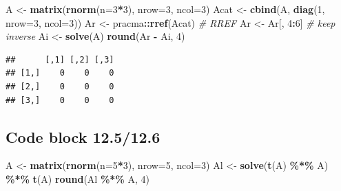 \documentclass[
]{book}
\newenvironment{Shaded}{\begin{snugshade}}{\end{snugshade}}
\newcommand{\CommentTok}[1]{\textcolor[rgb]{0.56,0.35,0.01}{\textit{#1}}}
\newcommand{\DataTypeTok}[1]{\textcolor[rgb]{0.13,0.29,0.53}{#1}}
\newcommand{\DecValTok}[1]{\textcolor[rgb]{0.00,0.00,0.81}{#1}}
\newcommand{\KeywordTok}[1]{\textcolor[rgb]{0.13,0.29,0.53}{\textbf{#1}}}
\newcommand{\NormalTok}[1]{#1}
\newcommand{\OperatorTok}[1]{\textcolor[rgb]{0.81,0.36,0.00}{\textbf{#1}}}
\newcommand{\StringTok}[1]{\textcolor[rgb]{0.31,0.60,0.02}{#1}}
\begin{document}
\begin{Shaded}
\begin{Highlighting}[]
\NormalTok{A \textless{}{-}}\StringTok{ }\KeywordTok{matrix}\NormalTok{(}\KeywordTok{rnorm}\NormalTok{(}\DataTypeTok{n=}\DecValTok{3}\OperatorTok{*}\DecValTok{3}\NormalTok{), }\DataTypeTok{nrow=}\DecValTok{3}\NormalTok{, }\DataTypeTok{ncol=}\DecValTok{3}\NormalTok{)}
\NormalTok{Acat \textless{}{-}}\StringTok{ }\KeywordTok{cbind}\NormalTok{(A, }\KeywordTok{diag}\NormalTok{(}\DecValTok{1}\NormalTok{, }\DataTypeTok{nrow=}\DecValTok{3}\NormalTok{, }\DataTypeTok{ncol=}\DecValTok{3}\NormalTok{))}
\NormalTok{Ar \textless{}{-}}\StringTok{ }\NormalTok{pracma}\OperatorTok{::}\KeywordTok{rref}\NormalTok{(Acat) }\CommentTok{\# RREF}
\NormalTok{Ar \textless{}{-}}\StringTok{ }\NormalTok{Ar[, }\DecValTok{4}\OperatorTok{:}\DecValTok{6}\NormalTok{] }\CommentTok{\# keep inverse}
\NormalTok{Ai \textless{}{-}}\StringTok{ }\KeywordTok{solve}\NormalTok{(A)}
\KeywordTok{round}\NormalTok{(Ar }\OperatorTok{{-}}\StringTok{ }\NormalTok{Ai, }\DecValTok{4}\NormalTok{)}
\end{Highlighting}
\end{Shaded}

\begin{verbatim}
##      [,1] [,2] [,3]
## [1,]    0    0    0
## [2,]    0    0    0
## [3,]    0    0    0
\end{verbatim}

\hypertarget{code-block-12.512.6}{%
\subsection*{Code block 12.5/12.6}\label{code-block-12.512.6}}

\begin{Shaded}
\begin{Highlighting}[]
\NormalTok{A \textless{}{-}}\StringTok{ }\KeywordTok{matrix}\NormalTok{(}\KeywordTok{rnorm}\NormalTok{(}\DataTypeTok{n=}\DecValTok{5}\OperatorTok{*}\DecValTok{3}\NormalTok{), }\DataTypeTok{nrow=}\DecValTok{5}\NormalTok{, }\DataTypeTok{ncol=}\DecValTok{3}\NormalTok{)}
\NormalTok{Al \textless{}{-}}\StringTok{ }\KeywordTok{solve}\NormalTok{(}\KeywordTok{t}\NormalTok{(A) }\OperatorTok{\%*\%}\StringTok{ }\NormalTok{A) }\OperatorTok{\%*\%}\StringTok{ }\KeywordTok{t}\NormalTok{(A)}
\KeywordTok{round}\NormalTok{(Al }\OperatorTok{\%*\%}\StringTok{ }\NormalTok{A, }\DecValTok{4}\NormalTok{)}
\end{Highlighting}
\end{Shaded}
\end{document}
